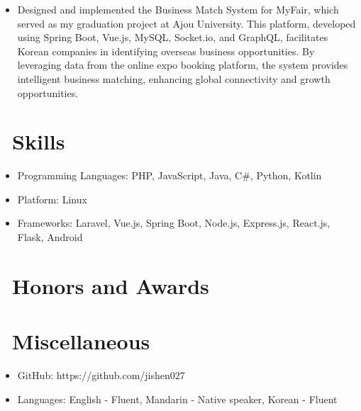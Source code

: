\documentclass{resume}
\begin{document}
\begin{itemize}
  \item Designed and implemented the Business Match System for MyFair, which served as my graduation project at Ajou University. This platform, developed using Spring Boot, Vue.js, MySQL, Socket.io, and GraphQL, facilitates Korean companies in identifying overseas business opportunities. By leveraging data from the online expo booking platform, the system provides intelligent business matching, enhancing global connectivity and growth opportunities.
\end{itemize}

\section{\faCogs\ Skills}
\begin{itemize}[parsep=0.5ex]
  \item Programming Languages: PHP, JavaScript, Java, C\#, Python, Kotlin
  \item Platform: Linux
  \item Frameworks: Laravel, Vue.js, Spring Boot, Node.js, Express.js, React.js, Flask, Android
\end{itemize}

\section{\faHeartO\ Honors and Awards}

\section{\faInfo\ Miscellaneous}
\begin{itemize}[parsep=0.5ex]
  \item GitHub: https://github.com/jishen027
  \item Languages: English - Fluent, Mandarin - Native speaker, Korean - Fluent
\end{itemize}

%
%
\end{document}
